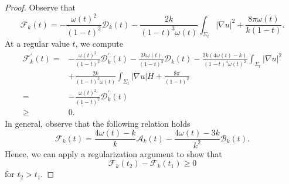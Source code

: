 \documentclass[12pt]{article}
\theoremstyle{definition}
\theoremstyle{plain}
\numberwithin{equation}{section}
\begin{document}
\begin{proof}
Observe that 
$$
\mathcal{F}_{k}(t)=-\frac{\omega(t)^{2}}{(1-t)^{2}}\mathcal{D}_{k}(t)-\frac{2k}{(1-t)^{3}\omega(t)}\int_{\Sigma_{t}}|\nabla u|^{2}+\frac{8\pi\omega(t)}{k(1-t)}.
$$
At a regular value $ t $, we compute 
$$
\begin{aligned}
\mathcal{F}_{k}^{\prime}(t)=&-\frac{\omega(t)^{2}}{(1-t)^{2}}\mathcal{D}_{k}^{\prime}(t)-\frac{2k\omega(t)}{(1-t)^{3}}\mathcal{D}_{k}(t)-\frac{2k(4\omega(t)-k)}{(1-t)^{4}\omega(t)^{2}}\int_{\Sigma_{t}}|\nabla u|^{2}\\
&+\frac{2k}{(1-t)^{3}\omega(t)}\int_{\Sigma_{t}}|\nabla u|H+\frac{8\pi}{(1-t)^{2}}\\
=&-\frac{\omega(t)^{2}}{(1-t)^{2}}\mathcal{D}_{k}^{\prime}(t)\\
\geq&0.
\end{aligned}
$$
In general, observe that the following relation holds
$$
\mathcal{F}_{k}(t)=\frac{4\omega(t)-k}{k}\mathcal{A}_{k}(t)-\frac{4\omega(t)-3k}{k^{2}}\mathcal{B}_{k}(t).
$$
Hence, we can apply a regularization argument to show that 
$$
\mathcal{F}_{k}(t_{2})-\mathcal{F}_{k}(t_{1})\geq0
$$
for $ t_{2}>t_{1} $.


\end{proof}
\end{document}
